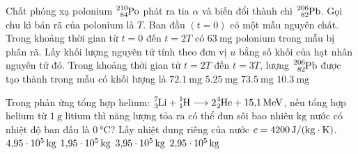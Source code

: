 \begin{ex}
	Chất phóng xạ polonium $\ce{^{210}_{84}Po}$ phát ra tia $\alpha$ và biến đổi thành chì $\ce{^{206}_{82}Pb}$. Gọi chu kì bán rã của polonium là $T$. Ban đầu $\left(t=0\right)$ có một mẫu nguyên chất. Trong khoảng thời gian từ $t=0$ đến $t=2T$ có $\SI{63}{\milli\gram}$ polonium trong mẫu bị phân rã. Lấy khối lượng nguyên tử tính theo đơn vị $\si{u}$ bằng số khối của hạt nhân nguyên tử đó. Trong khoảng thời gian từ $t=2T$ đến $t=3T$, lượng $\ce{^{206}_{82}Pb}$ được tạo thành trong mẫu có khối lượng là
	\choice
	{$\SI{72.1}{\milli\gram}$}
	{$\SI{5.25}{\milli\gram}$}
	{$\SI{73.5}{\milli\gram}$}
	{\True $\SI{10.3}{\milli\gram}$}
\end{ex}
\begin{ex}
	Trong phản ứng tổng hợp helium: $\ce{^7_3Li}+\ce{^1_1H}\longrightarrow2 \ce{^4_2He}+\SI{15.1}{\mega\electronvolt}$, nếu tổng hợp helium từ $\SI{1}{\gram}$ litium thì năng lượng tỏa ra có thể đun sôi bao nhiêu $\si{\kilo\gram}$ nước có nhiệt độ ban đầu là $\SI{0}{\celsius}$? Lấy nhiệt dung riêng của nước $c=\SI{4200}{\joule/\left(\kilogram\cdot\kelvin\right)}$.	
	\choice
	{\True $\SI{4.95E5}{\kilogram}$}
	{$\SI{1.95E5}{\kilogram}$}
	{$\SI{3.95E5}{\kilogram}$}
	{$\SI{2.95E5}{\kilogram}$}
\end{ex}
